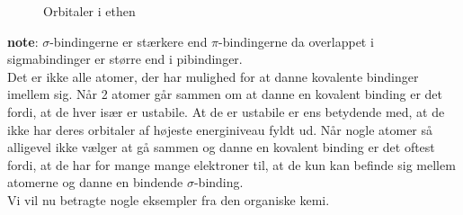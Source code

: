 \begin{wrapfigure}{r}{0.5\textwidth}
\begin{center}
\end{center}
\caption{Orbitaler i ethen \label{fig:ethen}}
\end{wrapfigure}

\textbf{note}: $\sigma$-bindingerne er stærkere end $\pi$-bindingerne da overlappet i sigmabindinger er større end i pibindinger.
\\

Det er ikke alle atomer, der har mulighed for at danne kovalente bindinger imellem sig. Når 2 atomer går sammen om at danne en kovalent binding er det fordi, at de hver især er ustabile. At de er ustabile er ens betydende med, at de ikke har deres orbitaler af højeste energiniveau fyldt ud. Når nogle atomer så alligevel ikke vælger at gå sammen og danne en kovalent binding er det oftest fordi, at de har for mange mange elektroner til, at de kun kan befinde sig mellem atomerne og danne en bindende $\sigma$-binding.
\\

Vi vil nu betragte nogle eksempler fra den organiske kemi.

